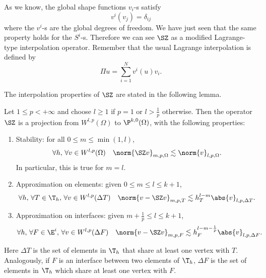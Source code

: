 \begin{remark}
    As we know, the global shape functions $v_i$-s satisfy
    \[
    v^i(v_j) = \delta_{ij}
    \]
    where the $v^i$-s are the global degrees of freedom. We have just seen that the same property holds for the $S^i$-s. Therefore we can see $\SZ$ as a modified Lagrange-type interpolation operator. Remember that the usual Lagrange interpolation is defined by
    \[
    \Pi u = \sum_{i=1}^N v^i(u) v_i.
    \]
\end{remark}

The interpolation properties of $\SZ$ are stated in the following lemma.
\begin{lemma}
    Let $1\le p < +\infty$ and choose $l\ge1$ if $p=1$ or $l>\frac{1}{p}$ otherwise. Then the operator $\SZ$ is a projection from $W^{l,p}(\Omega)$ to $\P^{k,0}(\Omega)$, with the following properties:
    \begin{enumerate}
        \item Stability: for all $0 \le m \le \min(1,l)$,
        \[
        \forall h, \, \forall v \in W^{l,p}(\Omega) \quad 
        \norm{\SZ v}_{m,p,\Omega} \lesssim \norm{v}_{l,p,\Omega}.
        \]
        In particular, this is true for $m=l$.
        \item Approximation on elements: given $0\le m\le l\le k+1$,
        \[
        \forall h, \, \forall T \in \T_h, \, \forall v \in W^{l,p}(\Delta T) \quad 
        \norm{v- \SZ v}_{m,p,T} \lesssim h_T^{l-m} \abs{v}_{l,p,\Delta T}.
        \]
        \item Approximation on interfaces: given $m+\frac{1}{p}\le l\le k+1$,
        \[
        \forall h, \, \forall F \in \E^i, \, \forall v \in W^{l,p}(\Delta F) \quad 
        \norm{v- \SZ v}_{m,p,F} \lesssim h_F^{l-m-\frac{1}{p}} \abs{v}_{l,p,\Delta F}.
        \]
    \end{enumerate}
    Here $\Delta T$ is the set of elements in $\T_h$ that share at least one vertex with $T$. Analogously, if $F$ is an interface between two elements of $\T_h$, $\Delta F$ is the set of elements in $\T_h$ which share at least one vertex with $F$.
\end{lemma}



